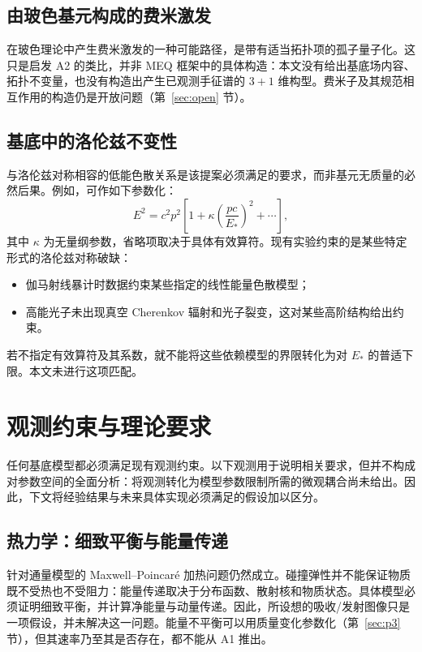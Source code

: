 \documentclass[UTF8,fontset=none,11pt,a4paper]{ctexart}
\begin{document}
\subsection{由玻色基元构成的费米激发}\label{sec:fermions}

在玻色理论中产生费米激发的一种可能路径，是带有适当拓扑项的孤子量子化\cite{Skyrme1962,Goldstone1981}。这只是启发 A2 的类比，并非 MEQ 框架中的具体构造：本文没有给出基底场内容、拓扑不变量，也没有构造出产生已观测手征谱的 $3+1$ 维构型。费米子及其规范相互作用的构造仍是开放问题（第~\ref{sec:open} 节）。

\subsection{基底中的洛伦兹不变性}

与洛伦兹对称相容的低能色散关系是该提案必须满足的要求，而非基元无质量的必然后果。例如，可作如下参数化：
\begin{equation}
E^2=c^2p^2\left[1+\kappa\left(\frac{pc}{E_\ast}\right)^2+\cdots\right],
\end{equation}
其中 $\kappa$ 为无量纲参数，省略项取决于具体有效算符。现有实验约束的是某些特定形式的洛伦兹对称破缺：
\begin{itemize}
\item 伽马射线暴计时数据约束某些指定的线性能量色散模型\cite{Abdo2009,Vasileiou2013}；
\item 高能光子未出现真空 Cherenkov 辐射和光子裂变，这对某些高阶结构给出约束\cite{Jacobson2003}。
\end{itemize}
若不指定有效算符及其系数，就不能将这些依赖模型的界限转化为对 $E_\ast$ 的普适下限\cite{Myers2005,Bolokhov2007}。本文未进行这项匹配。

\section{观测约束与理论要求}\label{sec:exp}

任何基底模型都必须满足现有观测约束。以下观测用于说明相关要求，但并不构成对参数空间的全面分析：将观测转化为模型参数限制所需的微观耦合尚未给出。因此，下文将经验结果与未来具体实现必须满足的假设加以区分。

\subsection{热力学：细致平衡与能量传递}\label{sec:heat}

针对通量模型的 Maxwell--Poincaré 加热问题仍然成立\cite{LeSage2002,Poincare1908}。碰撞弹性并不能保证物质既不受热也不受阻力：能量传递取决于分布函数、散射核和物质状态。具体模型必须证明细致平衡，并计算净能量与动量传递。因此，所设想的吸收/发射图像只是一项假设，并未解决这一问题。能量不平衡可以用质量变化参数化（第~\ref{sec:p3} 节），但其速率乃至其是否存在，都不能从 A1 推出。
\end{document}
